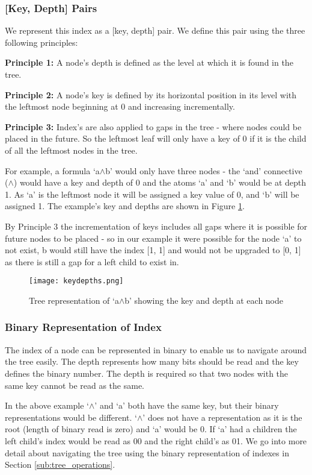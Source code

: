 \documentclass{report}
\begin{document}
\subsubsection{[Key, Depth] Pairs}

We represent this index as a [key, depth] pair. We define this pair using the three following principles:

\textbf{Principle 1:} A node's depth is defined as the level at which it is found in the tree. 

\textbf{Principle 2:} A node's key is defined by its horizontal position in its level with the leftmost node beginning at 0 and increasing incrementally.

\textbf{Principle 3:} Index's are also applied to gaps in the tree - where nodes could be placed in the future. So the leftmost leaf will only have a key of 0 if it is the child of all the leftmost nodes in the tree.

For example, a formula `a$\land$b' would only have three nodes - the `and' connective ($\land$) would have a key and depth of 0 and the atoms `a' and `b' would be at depth 1. As `a' is the leftmost node it will be assigned a key value of 0, and `b' will be assigned 1. The example's key and depths are shown in Figure \ref{keydepths}. 

By Principle 3 the incrementation of keys includes all gaps where it is possible for future nodes to be placed - so in our example it were possible for the node `a' to not exist, b would still have the index [1, 1] and would not be upgraded to [0, 1] as there is still a gap for a left child to exist in.

\begin{figure}[ht]
    \centering
    \texttt{[image: keydepths.png]}
    \caption{Tree representation of `a$\land$b' showing the key and depth at each node}
    \label{keydepths}
\end{figure}

\subsubsection{Binary Representation of Index}

The index of a node can be represented in binary to enable us to navigate around the tree easily. The depth represents how many bits should be read and the key defines the binary number. The depth is required so that two nodes with the same key cannot be read as the same. 

In the above example `$\land$' and `a' both have the same key, but their binary representations would be different. `$\land$' does not have a representation as it is the root (length of binary read is zero) and `a' would be 0. If `a' had a children the left child's index would be read as 00 and the right child's as 01. We go into more detail about navigating the tree using the binary representation of indexes in Section \ref{sub:tree_operations}.
\end{document}
